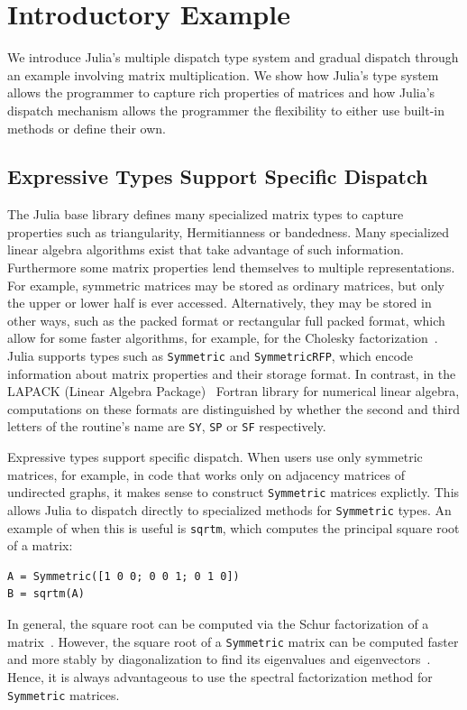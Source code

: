 \section{Introductory Example}

We introduce Julia's multiple dispatch type system and gradual dispatch through an example involving matrix multiplication. We show how Julia's type system allows the programmer to capture rich properties of matrices and how Julia's dispatch mechanism allows the programmer the flexibility to either use built-in methods or define their own.

\subsection{Expressive Types Support Specific Dispatch}
The Julia base library defines
many specialized matrix types to capture properties
such as triangularity, Hermitianness or bandedness. Many specialized
linear algebra algorithms exist that take advantage of such information.
Furthermore some matrix properties lend themselves to multiple representations.
For example, symmetric matrices may be stored as ordinary matrices, but only
the upper or lower half is ever accessed. Alternatively, they may be stored in
other ways, such as the packed format or rectangular full packed format, which
allow for some faster algorithms, for example, for the Cholesky
factorization~\cite{Gustavson2010}.
Julia supports types such as \lstinline|Symmetric| and \lstinline|SymmetricRFP|, which encode information about matrix properties and their storage format.
In contrast, in the LAPACK (Linear Algebra Package)~ Fortran library for numerical linear algebra, computations
on these formats are distinguished by whether the second and third letters of
the routine's name are \lstinline|SY|, \lstinline|SP| or \lstinline|SF|
respectively.

Expressive types support specific dispatch.
When users use only symmetric matrices, for example, in code that
works only on adjacency matrices of undirected graphs,
it makes sense to construct \lstinline|Symmetric| matrices explictly.
This allows Julia to dispatch directly to specialized methods for \lstinline|Symmetric|
types. An example of when this is useful is \lstinline|sqrtm|, which computes the
principal square root of a matrix:
\begin{lstlisting}
A = Symmetric([1 0 0; 0 0 1; 0 1 0])
B = sqrtm(A)
\end{lstlisting}
In general, the square root can be computed
via the Schur factorization of a matrix~\cite{Golub2013}. However, the square
root of a \lstinline|Symmetric| matrix can be computed faster and more stably
by diagonalization to find its eigenvalues and
eigenvectors~\cite{Higham2008,Golub2013}. Hence, it is always advantageous to
use the spectral factorization method for \lstinline|Symmetric| matrices.

